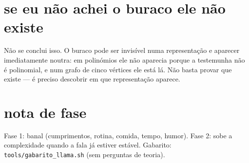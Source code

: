 \documentclass[11pt,a4paper]{article}
\newcommand{\code}[1]{\texttt{\small #1}}
\begin{document}
\section{se eu não achei o buraco ele não existe}
Não se conclui isso. O buraco pode ser invisível numa representação e aparecer
imediatamente noutra: em polinómios ele não aparecia porque a testemunha não é polinomial,
e num grafo de cinco vértices ele está lá. Não basta provar que existe — é preciso
descobrir em que representação aparece.

\section{nota de fase}
Fase 1: banal (cumprimentos, rotina, comida, tempo, humor).
Fase 2: sobe a complexidade quando a fala já estiver estável.
Gabarito: \code{tools/gabarito\_llama.sh} (sem perguntas de teoria).
\end{document}
